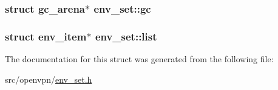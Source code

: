 \subsubsection[{gc}]{\setlength{\rightskip}{0pt plus 5cm}struct {\bf gc\+\_\+arena}$\ast$ env\+\_\+set\+::gc}\label{structenv__set_ac1f5edea620699ff13763b84a008e365}
\hypertarget{structenv__set_a0d97d5b4606ebd0594ac8c05669f265a}{}
\subsubsection[{list}]{\setlength{\rightskip}{0pt plus 5cm}struct {\bf env\+\_\+item}$\ast$ env\+\_\+set\+::list}\label{structenv__set_a0d97d5b4606ebd0594ac8c05669f265a}


The documentation for this struct was generated from the following file\+:\begin{DoxyCompactItemize}
\item 
src/openvpn/\hyperlink{env__set_8h}{env\+\_\+set.\+h}\end{DoxyCompactItemize}
